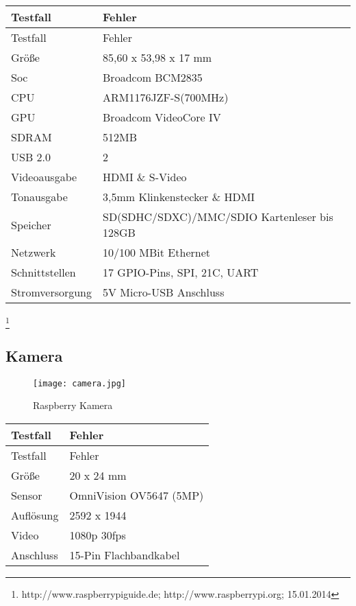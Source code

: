 \begin{longtable}{||l|l||}

\hline
Testfall & Fehler\\ \hline\hline
\endfirsthead
\hline
Testfall & Fehler \\ \hline\hline
\endhead

Größe & 85,60 x 53,98 x 17 mm\\ \hline
Soc & Broadcom BCM2835\\ \hline
CPU & ARM1176JZF-S(700MHz)\\ \hline
GPU & Broadcom VideoCore IV \\ \hline
SDRAM & 512MB\\ \hline
USB 2.0 & 2\\ \hline
Videoausgabe & HDMI \& S-Video\\ \hline
Tonausgabe & 3,5mm Klinkenstecker \& HDMI\\ \hline
Speicher & SD(SDHC/SDXC)/MMC/SDIO Kartenleser bis 128GB\\ \hline
Netzwerk & 10/100 MBit Ethernet\\ \hline
Schnittstellen & 17 GPIO-Pins, SPI, 21C, UART\\ \hline
Stromversorgung & 5V Micro-USB Anschluss\\ \hline

\end{longtable}
\footnote{http://www.raspberrypiguide.de; http://www.raspberrypi.org; 15.01.2014}


\newpage

\subsection{Kamera}

\begin{figure}[h]
  \begin{center}		%
    \texttt{[image: camera.jpg]}
  		  \caption{Raspberry Kamera}
     \label{raspCam}
  \end{center}
\end{figure}


\begin{longtable}{||l|l||}

\hline
Testfall & Fehler\\ \hline\hline
\endfirsthead
\hline
Testfall & Fehler \\ \hline\hline
\endhead

Größe & 20 x 24 mm\\ \hline
Sensor & OmniVision OV5647 (5MP)\\ \hline
Auflösung & 2592 x 1944\\ \hline
Video & 1080p \@ 30fps \\ \hline
Anschluss & 15-Pin Flachbandkabel\\ \hline

\end{longtable}



